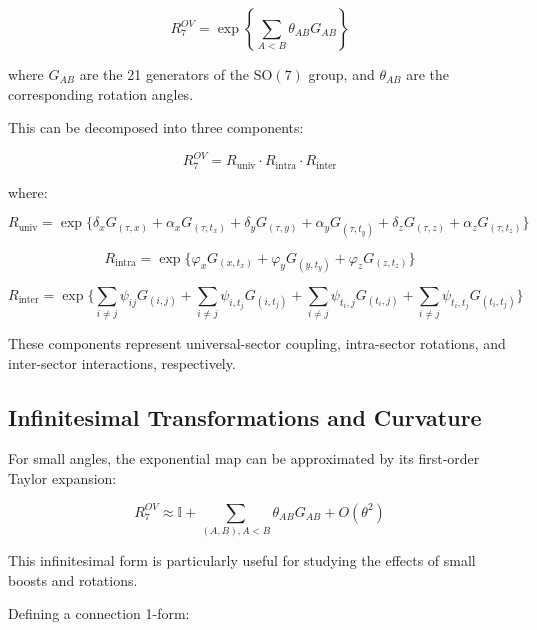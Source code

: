 \documentclass{article}
\begin{document}
\begin{equation}
R^{OV}_7 = \exp\left\{\sum_{A<B} \theta_{AB} G_{AB}\right\}
\end{equation}

where $G_{AB}$ are the 21 generators of the $\text{SO}(7)$ group, and $\theta_{AB}$ are the corresponding rotation angles.

This can be decomposed into three components:

\begin{equation}
R^{OV}_7 = R_{\text{univ}} \cdot R_{\text{intra}} \cdot R_{\text{inter}}
\end{equation}

where:

\begin{equation}
R_{\text{univ}} = \exp\{\delta_x G_{(\tau,x)} + \alpha_x G_{(\tau,t_x)} + \delta_y G_{(\tau,y)} + \alpha_y G_{(\tau,t_y)} + \delta_z G_{(\tau,z)} + \alpha_z G_{(\tau,t_z)}\}
\end{equation}

\begin{equation}
R_{\text{intra}} = \exp\{\varphi_x G_{(x,t_x)} + \varphi_y G_{(y,t_y)} + \varphi_z G_{(z,t_z)}\}
\end{equation}

\begin{equation}
R_{\text{inter}} = \exp\{\sum_{i\neq j} \psi_{ij} G_{(i,j)} + \sum_{i\neq j} \psi_{i,t_j} G_{(i,t_j)} + \sum_{i\neq j} \psi_{t_i,j} G_{(t_i,j)} + \sum_{i\neq j} \psi_{t_i,t_j} G_{(t_i,t_j)}\}
\end{equation}

These components represent universal-sector coupling, intra-sector rotations, and inter-sector interactions, respectively.

\subsection{Infinitesimal Transformations and Curvature}

For small angles, the exponential map can be approximated by its first-order Taylor expansion:

\begin{equation}
R^{OV}_7 \approx \mathbb{I} + \sum_{(A,B), A<B} \theta_{AB} G_{AB} + O(\theta^2)
\end{equation}

This infinitesimal form is particularly useful for studying the effects of small boosts and rotations.

Defining a connection 1-form:
\end{document}

